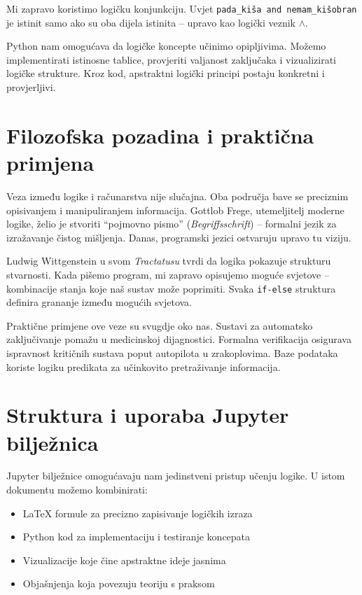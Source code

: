 Mi zapravo koristimo logičku konjunkciju. Uvjet \texttt{pada\_kiša and nemam\_kišobran} je istinit samo ako su oba dijela istinita -- upravo kao logički veznik $\wedge$.

Python nam omogućava da logičke koncepte učinimo opipljivima. Možemo implementirati istinosne tablice, provjeriti valjanost zaključaka i vizualizirati logičke strukture. Kroz kod, apstraktni logički principi postaju konkretni i provjerljivi.

\section*{Filozofska pozadina i praktična primjena}

Veza između logike i računarstva nije slučajna. Oba područja bave se preciznim opisivanjem i manipuliranjem informacija. Gottlob Frege, utemeljitelj moderne logike, želio je stvoriti ``pojmovno pismo'' (\textit{Begriffsschrift}) -- formalni jezik za izražavanje čistog mišljenja. Danas, programski jezici ostvaruju upravo tu viziju.

Ludwig Wittgenstein u svom \textit{Tractatusu} tvrdi da logika pokazuje strukturu stvarnosti. Kada pišemo program, mi zapravo opisujemo moguće svjetove -- kombinacije stanja koje naš sustav može poprimiti. Svaka \texttt{if-else} struktura definira grananje između mogućih svjetova.

Praktične primjene ove veze su svugdje oko nas. Sustavi za automatsko zaključivanje pomažu u medicinskoj dijagnostici. Formalna verifikacija osigurava ispravnost kritičnih sustava poput autopilota u zrakoplovima. Baze podataka koriste logiku predikata za učinkovito pretraživanje informacija.

\section*{Struktura i uporaba Jupyter bilježnica}

Jupyter bilježnice omogućavaju nam jedinstveni pristup učenju logike. U istom dokumentu možemo kombinirati:
\begin{itemize}
\item LaTeX formule za precizno zapisivanje logičkih izraza
\item Python kod za implementaciju i testiranje koncepata
\item Vizualizacije koje čine apstraktne ideje jasnima
\item Objašnjenja koja povezuju teoriju s praksom
\end{itemize}

